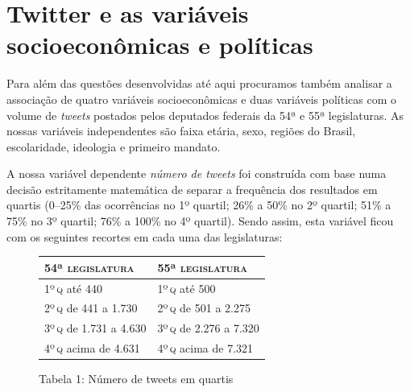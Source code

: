 
\section{Twitter e as variáveis socioeconômicas e políticas}

Para além das questões desenvolvidas até aqui procuramos também analisar
a associação de quatro variáveis socioeconômicas e duas variáveis
políticas com o volume de \emph{tweets} postados pelos deputados
federais da 54ª e 55ª legislaturas. As nossas variáveis independentes
são faixa etária, sexo, regiões do Brasil, escolaridade, ideologia e
primeiro mandato.

A nossa variável dependente \textit{número de tweets} foi
construída com base numa decisão estritamente matemática de separar a
frequência dos resultados em quartis (0--25\% das ocorrências no 1º
quartil; 26\% a 50\% no 2º quartil; 51\% a 75\% no 3º quartil; 76\% a
100\% no 4º quartil). Sendo assim, esta variável ficou com os seguintes
recortes em cada uma das legislaturas:

\begin{figure}[!ht]
\begin{center}
\begin{tabular}{|l|l|}
\hline
\textsc{54ª legislatura} & \textsc{55ª legislatura} \\ \hline\hline
1º\,\textsc{q} até 440 & 1º\,\textsc{q} até 500 \\ \hline
2º\,\textsc{q} de 441 a 1.730 & 2º\,\textsc{q} de 501 a 2.275 \\ \hline
3º\,\textsc{q} de 1.731 a 4.630 & 3º\,\textsc{q} de 2.276 a 7.320 \\ \hline
4º\,\textsc{q} acima de 4.631 & 4º\,\textsc{q} acima de 7.321 \\ \hline
\end{tabular}
\end{center}

\caption{Tabela 1: Número de tweets em quartis\footnotemark}
\end{figure}



